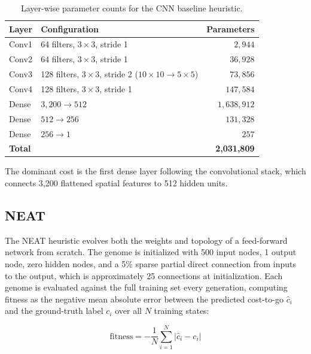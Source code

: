 \begin{table}[htbp]
\centering
\begin{tabular}{llr}
\toprule
\textbf{Layer} & \textbf{Configuration} & \textbf{Parameters} \\
\midrule
Conv1  & 64 filters, $3\times3$, stride 1                              & $2{,}944$       \\
Conv2  & 64 filters, $3\times3$, stride 1                              & $36{,}928$      \\
Conv3  & 128 filters, $3\times3$, stride 2 ($10{\times}10\to5{\times}5$) & $73{,}856$    \\
Conv4  & 128 filters, $3\times3$, stride 1                             & $147{,}584$     \\
Dense  & $3{,}200 \to 512$                                             & $1{,}638{,}912$ \\
Dense  & $512 \to 256$                                                 & $131{,}328$     \\
Dense  & $256 \to 1$                                                   & $257$           \\
\midrule
\textbf{Total} & & \textbf{2,031,809} \\
\bottomrule
\end{tabular}
\caption{Layer-wise parameter counts for the CNN baseline heuristic.}
\label{tab:cnn_params}
\end{table}

The dominant cost is the first dense layer following the convolutional stack, which connects 3,200 flattened spatial features to 512 hidden units.

\subsection{NEAT}

The NEAT heuristic evolves both the weights and topology of a feed-forward network from scratch. The genome is initialized with 500 input nodes, 1 output node, zero hidden nodes, and a 5\% sparse partial direct connection from inputs to the output, which is approximately 25 connections at initialization. Each genome is evaluated against the full training set every generation, computing fitness as the negative mean absolute error between the predicted cost-to-go $\hat{c}_i$ and the ground-truth label $c_i$ over all $N$ training states:

$$\text{fitness} = -\frac{1}{N}\sum_{i=1}^{N} |\hat{c}_i - c_i|$$

